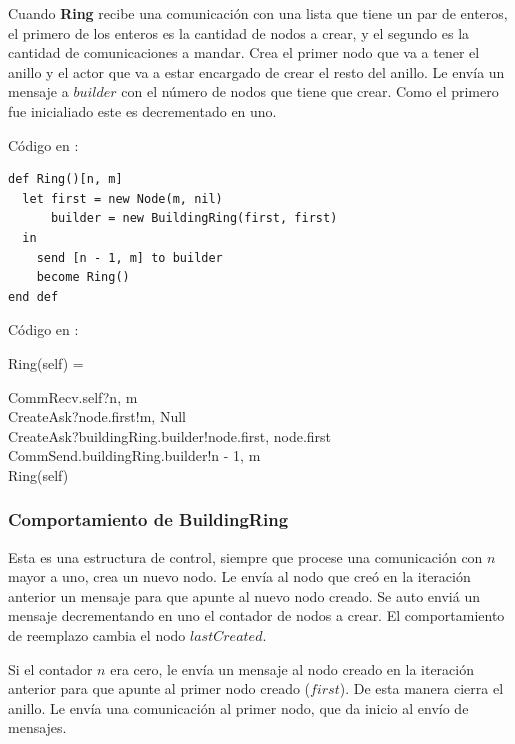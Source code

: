 Cuando \textbf{Ring} recibe una comunicación con una lista que tiene un par de enteros, el primero de los enteros es la cantidad de nodos a crear, y el segundo es la cantidad de comunicaciones a mandar. Crea el primer nodo que va a tener el anillo y el actor que va a estar encargado de crear el resto del anillo. Le envía un mensaje a $builder$ con el número de nodos que tiene que crear. Como el primero fue inicialiado este es decrementado en uno.

Código en \SAL:

\begin{lstlisting}[language=sal, style=simple]
def Ring()[n, m]
  let first = new Node(m, nil)
      builder = new BuildingRing(first, first) 
  in
    send [n - 1, m] to builder
    become Ring() 
end def
\end{lstlisting}

Código en \CSP:

\begin{process}
Ring(self) = \\ \quad
  \begin{block}
  CommRecv.self?\langle n, m \rangle \then \\
  CreateAsk?node.first!\langle m, Null \rangle \then \\
  CreateAsk?buildingRing.builder!\langle node.first, node.first \rangle \then \\
  CommSend.buildingRing.builder!\langle n - 1, m\rangle \then \\
  Ring(self)
  \end{block}
\end{process}

\subsubsection*{Comportamiento de BuildingRing}

Esta es una estructura de control, siempre que procese una comunicación con $n$ mayor a uno, crea un nuevo nodo. Le envía al nodo que creó en la iteración anterior un mensaje para que apunte al nuevo nodo creado. Se auto enviá un mensaje decrementando en uno el contador de nodos a crear. El comportamiento de reemplazo cambia el nodo $lastCreated$.

Si el contador $n$ era cero, le envía un mensaje al nodo creado en la iteración anterior para que apunte al primer nodo creado ($first$). De esta manera cierra el anillo. Le envía una comunicación al primer nodo, que da inicio al envío de mensajes. 

